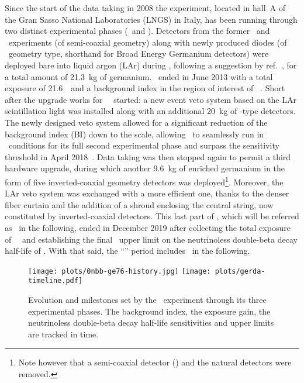 Since the start of the data taking in 2008 the experiment, located in hall~A of the Gran
Sasso National Laboratories (LNGS) in Italy, has been running through two distinct
experimental phases (\phaseone\ and \phasetwo). Detectors from the former \hdm\ and \igex\
experiments (of semi-coaxial geometry) along with newly produced diodes (of \bege\
geometry type, shorthand for Broad Energy Germanium detectors) were deployed bare into
liquid argon (LAr) during \phaseone, following a suggestion by ref.~\cite{Heusser1995},
for a total amount of 21.3~kg of germanium. \phaseone\ ended in June 2013 with a total
exposure of 21.6~\kgyr\ and a background index in the region of interest of
\pIbi~\cite{Agostini2016}.  Short after the upgrade works for \gerda\ \phasetwo\ started:
a new event veto system based on the LAr scintillation light was installed along with an
additional 20~kg of \bege-type detectors.  The newly designed veto system allowed for a
significant reduction of the background index (BI) down to the \powctsper{-4} scale, allowing
\gerda\ to seamlessly run in \bkgfree\ conditions for its full second experimental phase
and surpass the \powtenyr{26} sensitivity threshold in April 2018~\cite{Agostini2019a}.
Data taking was then stopped again to permit a third hardware upgrade, during which
another 9.6~kg of enriched germanium in the form of five inverted-coaxial geometry
detectors was deployed\footnote{Note however that a semi-coaxial detector (\ANG{1}) and
the natural \GTF{} detectors were removed.}. Moreover, the LAr veto system was exchanged
with a more efficient one, thanks to the denser fiber curtain and the addition of a shroud
enclosing the central string, now constituted by inverted-coaxial detectors. This last
part of \phasetwo, which will be referred as \phasetwop\ in the following, ended in
December 2019 after collecting the total exposure of \fillme{fillme}~\kgyr\ and
establishing the final \gerda\ upper limit on the neutrinoless double-beta decay half-life
of \gerdafinallimit. With that said, the ``\phasetwo'' period includes \phasetwop\ in the
following.

\begin{figure}
  \centering
  \texttt{[image: plots/0nbb-ge76-history.jpg]}
  \texttt{[image: plots/gerda-timeline.pdf]}
  \caption{%
    Evolution and milestones set by the \gerda\ experiment through its three experimental
    phases. The background index, the exposure gain, the neutrinoless double-beta decay
    half-life sensitivities and upper limits are tracked in time.
  }
\end{figure}

